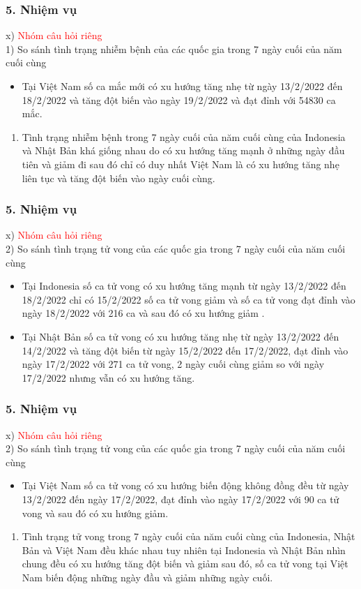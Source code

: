 \documentclass[english,10pt,table]{beamer}
\begin{document}
\begin{frame}[fragile]
\frametitle{5.  Nhiệm vụ}
x) \textcolor{red}{Nhóm câu hỏi riêng}\\
        1) So sánh tình trạng nhiễm bệnh của các quốc gia trong 7 ngày cuối của năm cuối cùng
\begin{itemize}
   \item Tại Việt Nam số ca mắc mới có xu hướng tăng nhẹ từ ngày 13/2/2022 đến 18/2/2022 và tăng đột biến vào ngày 19/2/2022 và đạt đỉnh với 54830 ca mắc.
	\end{itemize}
	\begin{enumerate}[=>]
	\item Tình trạng nhiễm bệnh trong 7 ngày cuối của năm cuối cùng của Indonesia và Nhật Bản khá giống nhau do có xu hướng tăng mạnh ở những ngày đầu tiên và giảm đi sau đó chỉ có duy nhất Việt Nam là có xu hướng tăng nhẹ liên tục và tăng đột biến vào ngày cuối cùng.
	\end{enumerate}
\end{frame}

\begin{frame}[fragile]
\frametitle{5.  Nhiệm vụ}
x) \textcolor{red}{Nhóm câu hỏi riêng}\\
2) So sánh tình trạng tử vong của các quốc gia trong 7 ngày cuối của năm cuối cùng
        \begin{itemize}
	\item Tại Indonesia số ca tử vong có xu hướng tăng mạnh từ ngày 13/2/2022 đến 18/2/2022 chỉ có 15/2/2022 số ca tử vong giảm và số ca tử vong đạt đỉnh vào ngày 18/2/2022 với 216 ca và sau đó có xu hướng giảm .
   \item Tại Nhật Bản  số ca tử vong có xu hướng tăng nhẹ từ ngày 13/2/2022 đến 14/2/2022 và tăng đột biến từ ngày 15/2/2022 đến 17/2/2022, đạt đỉnh vào ngày 17/2/2022 với 271 ca tử vong, 2 ngày cuối cùng giảm so với ngày 17/2/2022 nhưng vẫn có xu hướng tăng.
   \end{itemize}
\end{frame}

\begin{frame}[fragile]
\frametitle{5.  Nhiệm vụ}
x) \textcolor{red}{Nhóm câu hỏi riêng}\\
2) So sánh tình trạng tử vong của các quốc gia trong 7 ngày cuối của năm cuối cùng
        \begin{itemize}
   \item Tại Việt Nam số ca tử vong có xu hướng biến động không đồng đều từ ngày 13/2/2022 đến ngày 17/2/2022, đạt đỉnh vào ngày 17/2/2022 với 90 ca tử vong và sau đó có xu hướng giảm.
   \end{itemize}
	\begin{enumerate}[=>]
	\item Tình trạng tử vong trong 7 ngày  cuối của năm cuối cùng của Indonesia, Nhật Bản và Việt Nam đều khác nhau tuy nhiên tại Indonesia và Nhật Bản nhìn chung đều có xu hướng tăng đột biến và giảm sau đó, số ca tử vong tại Việt Nam biến động những ngày đầu và giảm những ngày cuối.
	\end{enumerate}
\end{frame}
\end{document}
